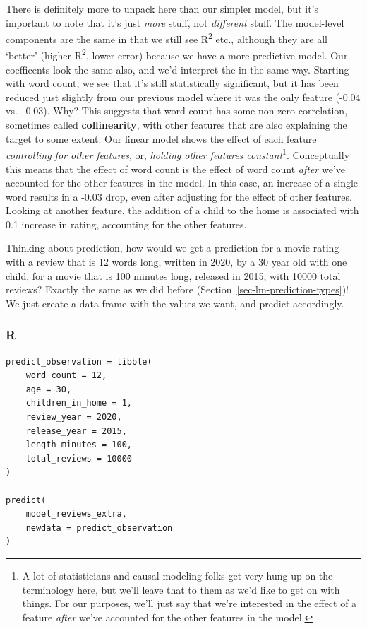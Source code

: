 \documentclass[
  letterpaper,
]{krantz}
\begin{document}
There is definitely more to unpack here than our simpler model, but it's
important to note that it's just \emph{more} stuff, not \emph{different}
stuff. The model-level components are the same in that we still see
R\textsuperscript{2} etc., although they are all `better' (higher
R\textsuperscript{2}, lower error) because we have a more predictive
model. Our coefficents look the same also, and we'd interpret the in the
same way. Starting with word count, we see that it's still statistically
significant, but it has been reduced just slightly from our previous
model where it was the only feature (-0.04 vs.~-0.03). Why? This
suggests that word count has some non-zero correlation, sometimes called
\textbf{collinearity}, with other features that are also explaining the
target to some extent. Our linear model shows the effect of each feature
\emph{controlling for other features}, or, \emph{holding other features
constant}\footnote{A lot of statisticians and causal modeling folks get
  very hung up on the terminology here, but we'll leave that to them as
  we'd like to get on with things. For our purposes, we'll just say that
  we're interested in the effect of a feature \emph{after} we've
  accounted for the other features in the model.}. Conceptually this
means that the effect of word count is the effect of word count
\emph{after} we've accounted for the other features in the model. In
this case, an increase of a single word results in a -0.03 drop, even
after adjusting for the effect of other features. Looking at another
feature, the addition of a child to the home is associated with 0.1
increase in rating, accounting for the other features.

Thinking about prediction, how would we get a prediction for a movie
rating with a review that is 12 words long, written in 2020, by a 30
year old with one child, for a movie that is 100 minutes long, released
in 2015, with 10000 total reviews? Exactly the same as we did before
(Section~\ref{sec-lm-prediction-types})! We just create a data frame
with the values we want, and predict accordingly.

\subsubsection{R}

\begin{verbatim}
predict_observation = tibble(
    word_count = 12,
    age = 30,
    children_in_home = 1,
    review_year = 2020,
    release_year = 2015,
    length_minutes = 100,
    total_reviews = 10000
)

predict(
    model_reviews_extra,
    newdata = predict_observation
)
\end{verbatim}
\end{document}
